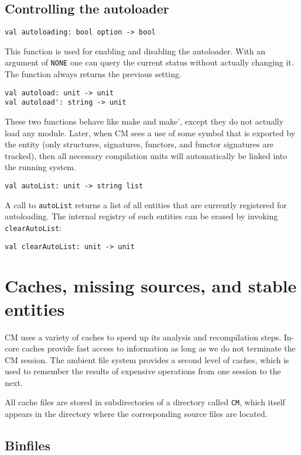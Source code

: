 \documentclass{article}
\begin{document}
\subsection{Controlling the autoloader}

\label{sec:autoload}

\begin{verbatim}
val autoloading: bool option -> bool
\end{verbatim}
This function is used for enabling and disabling the autoloader.  With
an argument of {\tt NONE} one can query the current status without
actually changing it.  The function always returns the previous
setting.

\begin{verbatim}
val autoload: unit -> unit
val autoload': string -> unit
\end{verbatim}
These two functions behave like make and make', except they do not
actually load any module.  Later, when CM sees a use of some symbol
that is exported by the entity (only structures, signatures, functors,
and functor signatures are tracked), then all necessary compilation
units will automatically be linked into the running system.

\begin{verbatim}
val autoList: unit -> string list
\end{verbatim}
A call to {\tt autoList} returns a list of all entities that are
currently registered for autoloading. The internal registry of such
entities can be erased by invoking {\tt clearAutoList}:
\begin{verbatim}
val clearAutoList: unit -> unit
\end{verbatim}

\section{Caches, missing sources, and stable entities}

CM uses a variety of caches to speed up its analysis and recompilation
steps.  In-core caches provide fast access to information as long as
we do not terminate the CM session.  The ambient file system provides
a second level of caches, which is used to remember the results of
expensive operations from one session to the next.

All cache files are stored in subdirectories of a directory called
{\tt CM}, which itself appears in the directory where the corresponding
source files are located.

\subsection{Binfiles}
\end{document}

